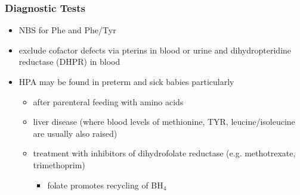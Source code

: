 \documentclass{scrartcl}
\begin{document}
\subsubsection{Diagnostic Tests}
\label{sec:org9507044}
\begin{itemize}
\item NBS for Phe and Phe/Tyr
\item exclude cofactor defects via pterins in blood or urine and
dihydropteridine reductase (DHPR) in blood
\item HPA may be found in preterm and sick babies particularly
\begin{itemize}
\item after parenteral feeding with amino acids
\item liver disease (where blood levels of methionine, TYR,
leucine/isoleucine are usually also raised)
\item treatment with inhibitors of dihydrofolate reductase (e.g. methotrexate, trimethoprim)
\begin{itemize}
\item folate promotes recycling of BH\(_{\text{4}}\)
\end{itemize}
\end{itemize}
\end{itemize}
\end{document}
